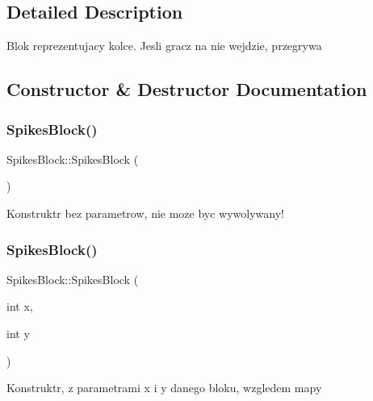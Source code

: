 \subsection{Detailed Description}
Blok reprezentujacy kolce. Jesli gracz na nie wejdzie, przegrywa 

\subsection{Constructor \& Destructor Documentation}
\mbox{\label{class_spikes_block_a01deb477eac15e0c173d47eca320377f}} 
\subsubsection{\texorpdfstring{Spikes\+Block()}{SpikesBlock()}\hspace{0.1cm}{\footnotesize\ttfamily [1/2]}}
{\footnotesize\ttfamily Spikes\+Block\+::\+Spikes\+Block (\begin{DoxyParamCaption}{ }\end{DoxyParamCaption})}

Konstruktr bez parametrow, nie moze byc wywolywany! \mbox{\label{class_spikes_block_ae1ae23307e042a765a02bcf208df00a6}} 
\subsubsection{\texorpdfstring{Spikes\+Block()}{SpikesBlock()}\hspace{0.1cm}{\footnotesize\ttfamily [2/2]}}
{\footnotesize\ttfamily Spikes\+Block\+::\+Spikes\+Block (\begin{DoxyParamCaption}\item[{int}]{x,  }\item[{int}]{y }\end{DoxyParamCaption})}

Konstruktr, z parametrami x i y danego bloku, wzgledem mapy \mbox{\label{class_spikes_block_a0f89c5c61dbdd9a8e69c6001c5b448c2}} 
